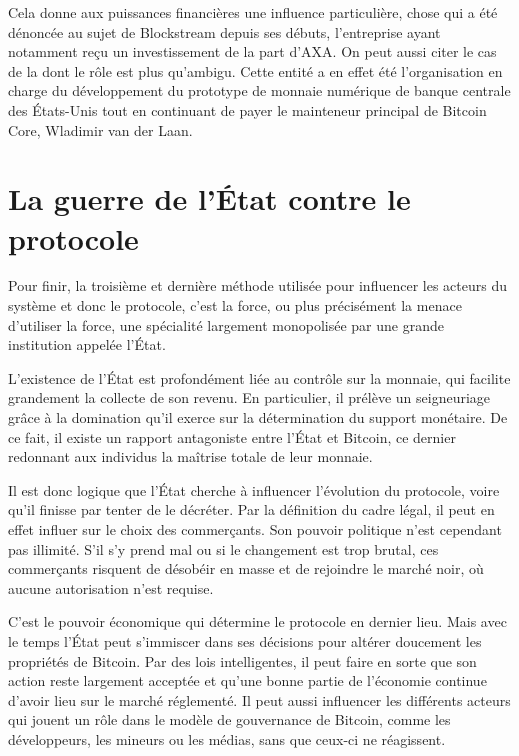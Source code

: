 Cela donne aux puissances financières une influence particulière, chose qui a été dénoncée au sujet de Blockstream depuis ses débuts, l'entreprise ayant notamment reçu un investissement de la part d'AXA. On peut aussi citer le cas de la  dont le rôle est plus qu'ambigu. Cette entité a en effet été l'organisation en charge du développement du prototype de monnaie numérique de banque centrale des États-Unis tout en continuant de payer le mainteneur principal de Bitcoin Core, Wladimir van der Laan.

\vspace{-1em}
\section*{La guerre de l'État contre le protocole} %

Pour finir, la troisième et dernière méthode utilisée pour influencer les acteurs du système et donc le protocole, c'est la force, ou plus précisément la menace d'utiliser la force, une spécialité largement monopolisée par une grande institution appelée l'État.

L'existence de l'État est profondément liée au contrôle sur la monnaie, qui facilite grandement la collecte de son revenu. En particulier, il prélève un seigneuriage grâce à la domination qu'il exerce sur la détermination du support monétaire. De ce fait, il existe un rapport antagoniste entre l'État et Bitcoin, ce dernier redonnant aux individus la maîtrise totale de leur monnaie. %

Il est donc logique que l'État cherche à influencer l'évolution du protocole, voire qu'il finisse par tenter de le décréter. Par la définition du cadre légal, il peut en effet influer sur le choix des commerçants. Son pouvoir politique n'est cependant pas illimité. S'il s'y prend mal ou si le changement est trop brutal, ces commerçants risquent de désobéir en masse et de rejoindre le marché noir, où aucune autorisation n'est requise.

C'est le pouvoir économique qui détermine le protocole en dernier lieu. Mais avec le temps l'État peut s'immiscer dans ses décisions pour altérer doucement les propriétés de Bitcoin. Par des lois intelligentes, il peut faire en sorte que son action reste largement acceptée et qu'une bonne partie de l'économie continue d'avoir lieu sur le marché réglementé. Il peut aussi influencer les différents acteurs qui jouent un rôle dans le modèle de gouvernance de Bitcoin, comme les développeurs, les mineurs ou les médias, sans que ceux-ci ne réagissent.

